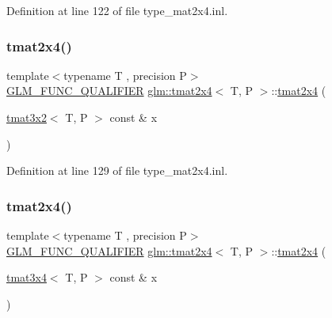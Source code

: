 Definition at line 122 of file type\+\_\+mat2x4.\+inl.

\mbox{\label{structglm_1_1tmat2x4_a52740ff1048b8283e22c07c743aaf8f9}} 
\subsubsection{\texorpdfstring{tmat2x4()}{tmat2x4()}\hspace{0.1cm}{\footnotesize\ttfamily [15/22]}}
{\footnotesize\ttfamily template$<$typename T , precision P$>$ \\
\mbox{\hyperlink{setup_8hpp_a33fdea6f91c5f834105f7415e2a64407}{G\+L\+M\+\_\+\+F\+U\+N\+C\+\_\+\+Q\+U\+A\+L\+I\+F\+I\+ER}} \mbox{\hyperlink{structglm_1_1tmat2x4}{glm\+::tmat2x4}}$<$ T, P $>$\+::\mbox{\hyperlink{structglm_1_1tmat2x4}{tmat2x4}} (\begin{DoxyParamCaption}\item[{\mbox{\hyperlink{structglm_1_1tmat3x2}{tmat3x2}}$<$ T, P $>$ const \&}]{x }\end{DoxyParamCaption})}



Definition at line 129 of file type\+\_\+mat2x4.\+inl.

\mbox{\label{structglm_1_1tmat2x4_aff5a2bf784029b260a810cf84ff5f228}} 
\subsubsection{\texorpdfstring{tmat2x4()}{tmat2x4()}\hspace{0.1cm}{\footnotesize\ttfamily [16/22]}}
{\footnotesize\ttfamily template$<$typename T , precision P$>$ \\
\mbox{\hyperlink{setup_8hpp_a33fdea6f91c5f834105f7415e2a64407}{G\+L\+M\+\_\+\+F\+U\+N\+C\+\_\+\+Q\+U\+A\+L\+I\+F\+I\+ER}} \mbox{\hyperlink{structglm_1_1tmat2x4}{glm\+::tmat2x4}}$<$ T, P $>$\+::\mbox{\hyperlink{structglm_1_1tmat2x4}{tmat2x4}} (\begin{DoxyParamCaption}\item[{\mbox{\hyperlink{structglm_1_1tmat3x4}{tmat3x4}}$<$ T, P $>$ const \&}]{x }\end{DoxyParamCaption})}



